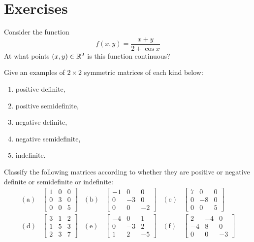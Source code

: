 
\section*{Exercises}
\begin{problem}[Basic]
Consider the function
\begin{equation*}
f(x,y) = \dfrac{x+y}{2+\cos x}
\end{equation*}
At what points $(x,y) \in \mathbb{R}^2$ is this function continuous?
\end{problem}

\begin{problem}[Intermediate]
Give an examples of $2 \times 2$ symmetric matrices of each kind below:
\begin{enumerate}
	\item positive definite, 
	\item positive semidefinite, 
	\item negative definite, 
	\item negative semidefinite,
	\item indefinite.
\end{enumerate}
\end{problem}

\begin{problem}[Basic]\cite[p.31, \#2]{peressini1988mathematics}
Classify the following matrices according to whether they are positive or negative definite or semidefinite or indefinite:
\begin{align*}
\mathrm{(a)} & \begin{bmatrix} 1 & 0 & 0 \\ 0 & 3 & 0 \\ 0 & 0 & 5 \end{bmatrix}  &
\mathrm{(b)} & \begin{bmatrix} -1 & 0 & 0 \\ 0 & -3 & 0 \\ 0 & 0 & -2 \end{bmatrix} &
\mathrm{(c)} & \begin{bmatrix} 7 & 0 & 0 \\ 0 & -8 & 0 \\ 0 & 0 & 5 \end{bmatrix}  \\
\mathrm{(d)} & \begin{bmatrix} 3 & 1 & 2 \\ 1 & 5 & 3 \\ 2 & 3 & 7 \end{bmatrix}  &
\mathrm{(e)} & \begin{bmatrix} -4 & 0 & 1 \\ 0 & -3 & 2 \\ 1 & 2 & -5 \end{bmatrix}  &
\mathrm{(f)} & \begin{bmatrix} 2 & -4 & 0 \\ -4 & 8 & 0 \\ 0 & 0 & -3 \end{bmatrix} 
\end{align*}
\end{problem}

